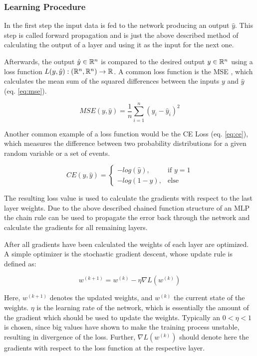 \subsubsection{Learning Procedure}

In the first step the input data is fed to the network producing an output $\hat{y}$.
This step is called forward propagation and is just the above described method of calculating the output of a layer and using it as the input for the next one.

Afterwards, the output $\hat{y} \in \mathbb{R}^n$ is compared to the desired output $y \in \mathbb{R}^n$ using a loss function $L(y, \hat{y}): (\mathbb{R}^n, \mathbb{R}^n) \to \mathbb{R}$.
A common loss function is the \ac{MSE} \cite{yolov1}, which calculates the mean sum of the squared differences between the inputs $y$ and $\hat{y}$ (eq. \ref{eq:mse}).

\begin{equation}
    \label{eq:mse}
    MSE(y, \hat{y}) = \frac{1}{n} \sum_{i=1}^{n}(y_i - \hat{y}_i)^2
\end{equation}

Another common example of a loss function would be the \ac{CE} Loss (eq. \ref{eq:ce}), which measures the difference between two probability distributions for a given random variable or a set of events. \cite{loss_function_segmentation}

\begin{equation}
    \label{eq:ce}
    CE(y, \hat{y}) =
    \begin{cases}
        -log(\hat{y}), & \text{if } y = 1\\
        -log(1 - \hat{y}), & \text{else}
    \end{cases}
\end{equation}

The resulting loss value is used to calculate the gradients with respect to the last layer weights. Due to the above described chained function structure of an \ac{MLP} the chain rule can be used to propagate the error back through the network and calculate the gradients for all remaining layers.

After all gradients have been calculated the weights of each layer are optimized.
A simple optimizer is the stochastic gradient descent, whose update rule is defined as:

\begin{equation}
    w^{(k+1)} = w^{(k)} - \eta \nabla L(w^{(k)})
\end{equation}

Here, $w^{(k+1)}$ denotes the updated weights, and $w^{(k)}$ the current state of the weights.
$\eta$ is the learning rate of the network, which is essentially the amount of the gradient which should be used to update the weights.
Typically an $0 < \eta < 1$ is chosen, since big values have shown to make the training process unstable, resulting in divergence of the loss.
Further, $\nabla L(w^{(k)})$ should denote here the gradients with respect to the loss function at the respective layer.

